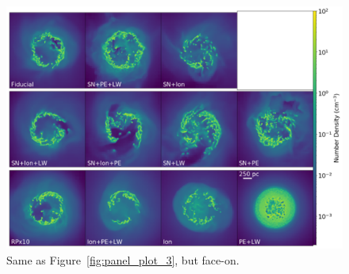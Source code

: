 \documentclass[twocolumn]{aastex62}
\begin{document}
\begin{figure}
  \centering
  \includegraphics[width=0.95\linewidth]{figures/proj_plot_n_z_350.png}
  \caption{Same as Figure~\ref{fig:panel_plot_3}, but face-on.}
  \label{fig:panel_plot_4}
\end{figure}
%
%




\end{document}
